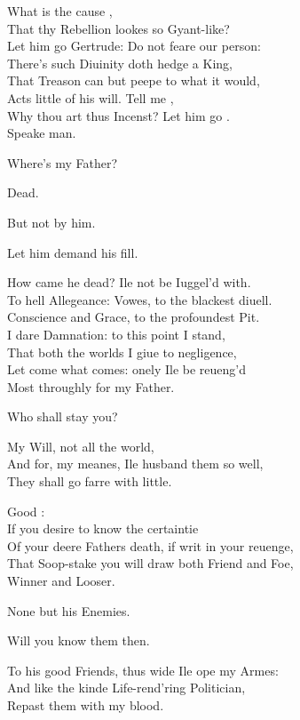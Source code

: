 \documentclass[a5paper,DIV=calc,11pt]{scrbook}
\begin{document}
\begin{drama*}
    \kingspeaks What is the cause \laer,\\
    That thy Rebellion lookes so Gyant-like?\\
    Let him go Gertrude: Do not feare our person:\\
    There's such Diuinity doth hedge a King,\\
    That Treason can but peepe to what it would,\\
    Acts little of his will. Tell me \laer,\\
    Why thou art thus Incenst? Let him go \queen.\\
    Speake man.
    
    \laerspeaks Where's my Father?
    
    \kingspeaks Dead.
    
    \queenspeaks But not by him.
    
    \kingspeaks Let him demand his fill.
    
    \laerspeaks How came he dead? Ile not be Iuggel'd with.\\
    To hell Allegeance: Vowes, to the blackest diuell.\\
    Conscience and Grace, to the profoundest Pit.\\
    I dare Damnation: to this point I stand,\\
    That both the worlds I giue to negligence,\\
    Let come what comes: onely Ile be reueng'd\\
    Most throughly for my Father.
    
    \kingspeaks Who shall stay you?
    
    \laerspeaks My Will, not all the world,\\
    And for, my meanes, Ile husband them so well,\\
    They shall go farre with little.
    
    \kingspeaks Good \laer:\\
    If you desire to know the certaintie\\
    Of your deere Fathers death, if writ in your reuenge,\\
    That Soop-stake you will draw both Friend and Foe,\\
    Winner and Looser.
    
    \laerspeaks None but his Enemies.
    
    \kingspeaks Will you know them then.
    
    \laerspeaks To his good Friends, thus wide Ile ope my Armes:\\
    And like the kinde Life-rend'ring Politician,\\
    Repast them with my blood.
    

\end{drama*}
\end{document}
